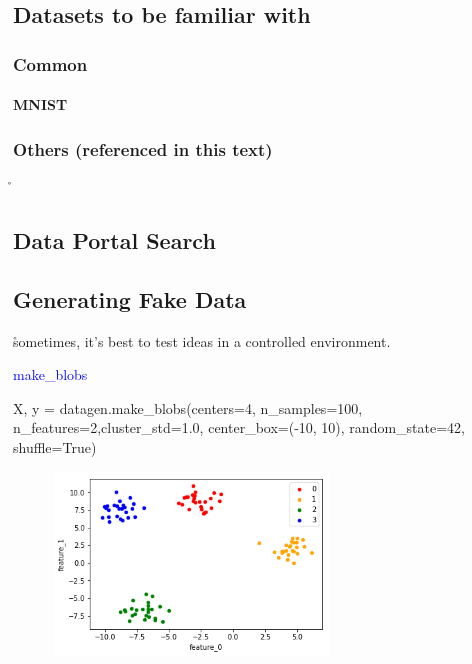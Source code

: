 \subsection{Datasets to be familiar with}

\subsubsection{Common}

\paragraph{MNIST}

\subsubsection{Others (referenced in this text)}
\r{}


\subsection{Data Portal Search}

\subsection{Generating Fake Data}


\r{sometimes, it's best to test ideas in a controlled environment.}

\textcolor{blue}{make\_blobs}

\begin{python}
X, y = datagen.make_blobs(centers=4, n_samples=100, n_features=2,cluster_std=1.0,
                          center_box=(-10, 10),
                          random_state=42, shuffle=True)
\end{python}


\begin{figure}
\centering
\includegraphics[width=0.65\textwidth]{./sync_imgs/datagen/blobs/2dimg.png}
\label{fig:datagen_blobs_2dimg}
\end{figure}

